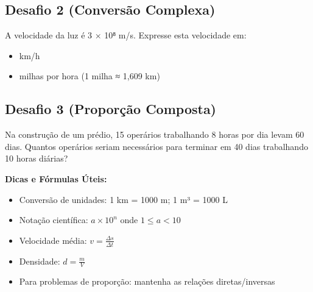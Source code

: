 \documentclass[11pt]{extarticle} %
\begin{document}
\begin{multicols}{2}
\subsection*{Desafio 2 (Conversão Complexa)}
A velocidade da luz é 3 × 10⁸ m/s. Expresse esta velocidade em:
\begin{itemize}
\item km/h
\item milhas por hora (1 milha ≈ 1,609 km)
\end{itemize}

\subsection*{Desafio 3 (Proporção Composta)}
Na construção de um prédio, 15 operários trabalhando 8 horas por dia levam 60 dias. Quantos operários seriam necessários para terminar em 40 dias trabalhando 10 horas diárias?

\end{multicols}

\begin{center}
\textbf{Dicas e Fórmulas Úteis:} 
\begin{itemize}
\item Conversão de unidades: 1 km = 1000 m; 1 m³ = 1000 L
\item Notação científica: $a \times 10^n$ onde $1 \leq a < 10$
\item Velocidade média: $v = \frac{\Delta s}{\Delta t}$
\item Densidade: $d = \frac{m}{V}$
\item Para problemas de proporção: mantenha as relações diretas/inversas
\end{itemize}
\end{center}
\end{document}
